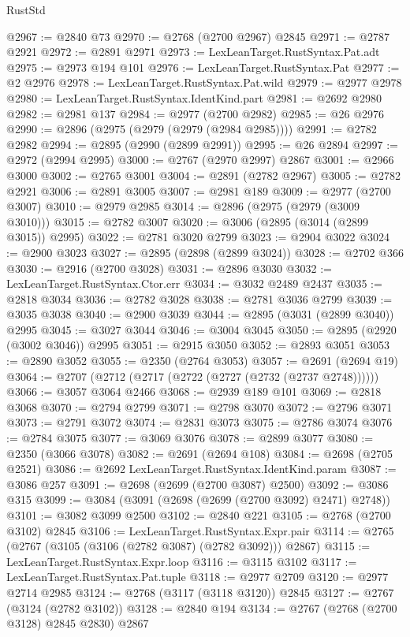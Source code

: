 \begin{lexlean}{RustStd}
\begin{coremodule}
@2967 := @2840 @73
@2970 := @2768 (@2700 @2967) @2845
@2971 := @2787 @2921
@2972 := @2891 @2971
@2973 := LexLeanTarget.RustSyntax.Pat.adt
@2975 := @2973 @194 @101
@2976 := LexLeanTarget.RustSyntax.Pat
@2977 := @2 @2976
@2978 := LexLeanTarget.RustSyntax.Pat.wild
@2979 := @2977 @2978
@2980 := LexLeanTarget.RustSyntax.IdentKind.part
@2981 := @2692 @2980
@2982 := @2981 @137
@2984 := @2977 (@2700 @2982)
@2985 := @26 @2976
@2990 := @2896 (@2975 (@2979 (@2979 (@2984 @2985))))
@2991 := @2782 @2982
@2994 := @2895 (@2990 (@2899 @2991))
@2995 := @26 @2894
@2997 := @2972 (@2994 @2995)
@3000 := @2767 (@2970 @2997) @2867
@3001 := @2966 @3000
@3002 := @2765 @3001
@3004 := @2891 (@2782 @2967)
@3005 := @2782 @2921
@3006 := @2891 @3005
@3007 := @2981 @189
@3009 := @2977 (@2700 @3007)
@3010 := @2979 @2985
@3014 := @2896 (@2975 (@2979 (@3009 @3010)))
@3015 := @2782 @3007
@3020 := @3006 (@2895 (@3014 (@2899 @3015)) @2995)
@3022 := @2781 @3020 @2799
@3023 := @2904 @3022
@3024 := @2900 @3023
@3027 := @2895 (@2898 (@2899 @3024))
@3028 := @2702 @366
@3030 := @2916 (@2700 @3028)
@3031 := @2896 @3030
@3032 := LexLeanTarget.RustSyntax.Ctor.err
@3034 := @3032 @2489 @2437
@3035 := @2818 @3034
@3036 := @2782 @3028
@3038 := @2781 @3036 @2799
@3039 := @3035 @3038
@3040 := @2900 @3039
@3044 := @2895 (@3031 (@2899 @3040)) @2995
@3045 := @3027 @3044
@3046 := @3004 @3045
@3050 := @2895 (@2920 (@3002 @3046)) @2995
@3051 := @2915 @3050
@3052 := @2893 @3051
@3053 := @2890 @3052
@3055 := @2350 (@2764 @3053)
@3057 := @2691 (@2694 @19)
@3064 := @2707 (@2712 (@2717 (@2722 (@2727 (@2732 (@2737 @2748))))))
@3066 := @3057 @3064 @2466
@3068 := @2939 @189 @101
@3069 := @2818 @3068
@3070 := @2794 @2799
@3071 := @2798 @3070
@3072 := @2796 @3071
@3073 := @2791 @3072
@3074 := @2831 @3073
@3075 := @2786 @3074
@3076 := @2784 @3075
@3077 := @3069 @3076
@3078 := @2899 @3077
@3080 := @2350 (@3066 @3078)
@3082 := @2691 (@2694 @108)
@3084 := @2698 (@2705 @2521)
@3086 := @2692 LexLeanTarget.RustSyntax.IdentKind.param
@3087 := @3086 @257
@3091 := @2698 (@2699 (@2700 @3087) @2500)
@3092 := @3086 @315
@3099 := @3084 (@3091 (@2698 (@2699 (@2700 @3092) @2471) @2748))
@3101 := @3082 @3099 @2500
@3102 := @2840 @221
@3105 := @2768 (@2700 @3102) @2845
@3106 := LexLeanTarget.RustSyntax.Expr.pair
@3114 := @2765 (@2767 (@3105 (@3106 (@2782 @3087) (@2782 @3092))) @2867)
@3115 := LexLeanTarget.RustSyntax.Expr.loop
@3116 := @3115 @3102
@3117 := LexLeanTarget.RustSyntax.Pat.tuple
@3118 := @2977 @2709
@3120 := @2977 @2714 @2985
@3124 := @2768 (@3117 (@3118 @3120)) @2845
@3127 := @2767 (@3124 (@2782 @3102))
@3128 := @2840 @194
@3134 := @2767 (@2768 (@2700 @3128) @2845 @2830) @2867

\end{coremodule}
\end{lexlean}
